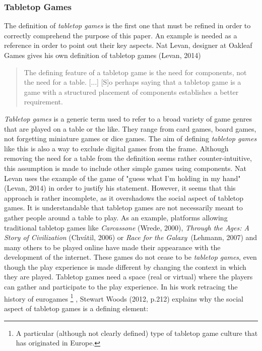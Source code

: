 \subsubsection{Tabletop Games}
The definition of \textit{tabletop games} is the first one that must be refined in order to correctly comprehend the purpose of this paper. An example is needed as a reference in order to point out their key aspects. Nat Levan, designer at Oakleaf Games gives his own definition of tabletop games (Levan, 2014)\cite{web:oak}
\begin{quotation}
The defining feature of a tabletop game is the need for components, not the need for a table. [...] [S]o perhaps saying that a tabletop game is a game with a structured placement of components establishes a better requirement.
\end{quotation} 
\textit{Tabletop games} is a generic term used to refer to a broad variety of game genres that are played on a table or the like. They range from card games, board games, not forgetting miniature games or dice games. The aim of defining \textit{tabletop games} like this is also a way to exclude digital games from the frame. 
Although removing the need for a table from the definition seems rather counter-intuitive, this assumption is made to include other simple games using components. Nat Levan uses the example of the game of "guess what I'm holding in my hand"(Levan, 2014) in order to justify his statement. 
However, it seems that this approach is rather incomplete, as it overshadows the social aspect of tabletop games. It is understandable that tabletop games are not necessarily meant to gather people around a table to play. As an example, platforms allowing traditional tabletop games like \textit{Carcassone} (Wrede, 2000)\cite{game:carca}, \textit{Through the Ages: A Story of Civilization} (Chvátil, 2006)\cite{game:ages} or \textit{Race for the Galaxy}\ (Lehmann, 2007)\cite{game:race} and many others to be played online have made their appearance with the development of the internet. 
These games do not cease to be \textit{tabletop games}, even though the play experience is made different by changing the context in which they are played. Tabletop games need a space (real or virtual) where the players can gather and participate to the play experience. In his work retracing the history of eurogames
\footnote{A particular (although not clearly defined) type of tabletop game culture that has originated in Europe.}
, Stewart Woods (2012, p.212)\cite{book:euro} explains why the social aspect of tabletop games is a defining element:
